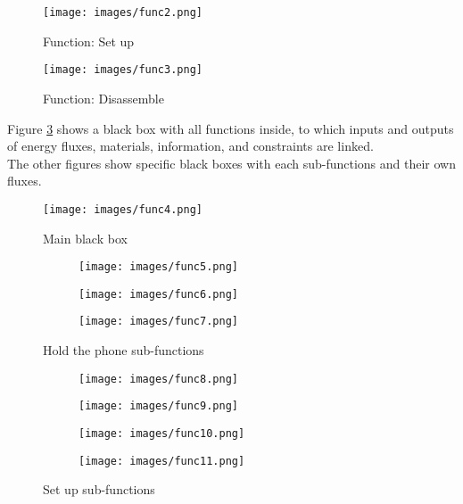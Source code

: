 \documentclass[11pt,a4paper]{article}
\begin{document}
		\begin{figure}[H]
			\centering
			\texttt{[image: images/func2.png]}
			\caption{Function: Set up}
			\label{Set up}
		\end{figure}
	
		\begin{figure}[H]
			\centering
			\texttt{[image: images/func3.png]}
			\caption{Function: Disassemble}
			\label{Disassemble}
		\end{figure}
	
		Figure \ref{Main black box} shows a black box with all functions inside, to which inputs and outputs of energy fluxes, materials, information, and constraints are linked. \\
		The other figures show specific black boxes with each sub-functions and their own fluxes. 
		 
		\begin{figure}[H]
			\centering
			\texttt{[image: images/func4.png]}
			\caption{Main black box}
			\label{Main black box}
		\end{figure}
	
		\begin{figure}[H]
			\begin{subfigure}[b]{0.3\textwidth}
				\texttt{[image: images/func5.png]}
			\end{subfigure}
			\hfill
			\begin{subfigure}[b]{0.3\textwidth}
				\texttt{[image: images/func6.png]}
			\end{subfigure}
			\hfill
			\begin{subfigure}[b]{0.3\textwidth}
				\texttt{[image: images/func7.png]}
			\end{subfigure}
			\caption{Hold the phone sub-functions}
			\label{Hold the phone sub-functions}	
		\end{figure}
	
		\begin{figure}[H]
			\begin{subfigure}[b]{0.5\textwidth}
				\centering
				\texttt{[image: images/func8.png]}
			\end{subfigure}
			\hfill
			\begin{subfigure}[b]{0.5\textwidth}
				\centering
				\texttt{[image: images/func9.png]}
			\end{subfigure}
		\end{figure}
		\begin{figure}[H]
			\begin{subfigure}[b]{0.5\textwidth}
				\centering
				\texttt{[image: images/func10.png]}
			\end{subfigure}
			\hfill
			\begin{subfigure}[b]{0.5\textwidth}
				\centering
				\texttt{[image: images/func11.png]}
			\end{subfigure}
			\caption{Set up sub-functions}
			\label{Set up sub-functions}	
		\end{figure}
	
\end{document}
